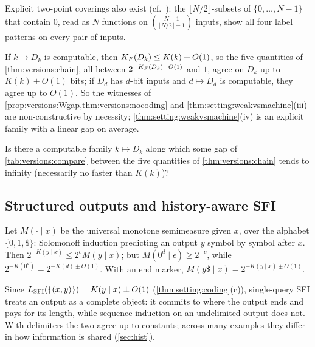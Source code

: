 Explicit two-point coverings also exist (cf.\ \citealp{kleitman1973families}): the $\lfloor N/2\rfloor$-subsets of $\{0,\dots,N-1\}$ that contain $0$, read as $N$ functions on $\binom{N-1}{\lfloor N/2\rfloor-1}$ inputs, show all four label patterns on every pair of inputs.

\begin{remark}\label{rem:versions:noncomputable}
If $k\mapsto D_k$ is computable, then $K_{F}(D_k)\le K(k)+O(1)$, so the five quantities of \cref{thm:versions:chain}, all between $2^{-K_{F}(D_k)-O(1)}$ and $1$, agree on $D_k$ up to $K(k)+O(1)$ bits; if $D_d$ has $d$-bit inputs and $d\mapsto D_d$ is computable, they agree up to $O(1)$. So the witnesses of \cref{prop:versions:Wgap,thm:versions:nocoding} and \cref{thm:setting:weakvsmachine}(iii) are non-constructive by necessity; \cref{thm:setting:weakvsmachine}(iv) is an explicit family with a linear gap on average.
\end{remark}

\begin{question}\label{q:versions:explicit}
Is there a computable family $k\mapsto D_k$ along which some gap of \cref{tab:versions:compare} between the five quantities of \cref{thm:versions:chain} tends to infinity (necessarily no faster than $K(k)$)?
\end{question}

\subsection{Structured outputs and history-aware SFI}\label{app:versions:structured}

\begin{proposition}\label{prop:versions:structured}
Let $M(\cdot\mid x)$ be the universal monotone semimeasure given $x$, over the alphabet $\{0,1,\$\}$: Solomonoff induction predicting an output $y$ symbol by symbol after $x$. Then $2^{-K(y\mid x)}\le2^cM(y\mid x)$; but $M(0^d\mid\epsilon)\ge2^{-c}$, while $2^{-K(0^d)}=2^{-K(d)\pm O(1)}$. With an end marker, $M(y\$\mid x)=2^{-K(y\mid x)\pm O(1)}$.
\end{proposition}

Since $L_{\mathrm{SFI}}(\{(x,y)\})=K(y\mid x)\pm O(1)$ (\cref{thm:setting:coding}(c)), single-query SFI treats an output as a complete object: it commits to where the output ends and pays for its length, while sequence induction on an undelimited output does not. With delimiters the two agree up to constants; across many examples they differ in how information is shared (\cref{sec:hist}).

